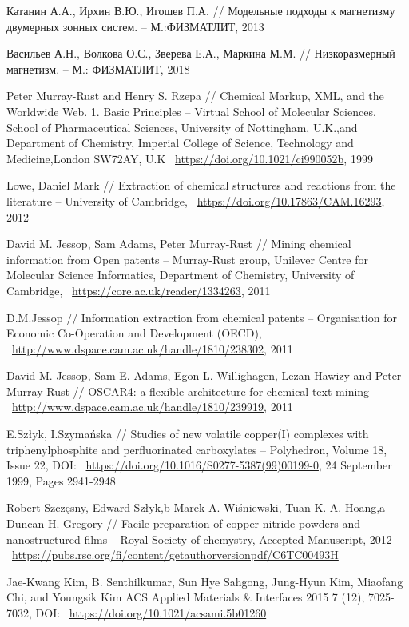 \documentclass[11pt]{article}
\begin{document}
\begin{thebibliography}{3}
Катанин А.А., Ирхин В.Ю., Игошев П.А. // Модельные подходы к магнетизму двумерных зонных систем. -- М.:ФИЗМАТЛИТ, 2013

Васильев А.Н., Волкова О.С., Зверева Е.А., Маркина М.М. // Низкоразмерный магнетизм. -- М.: ФИЗМАТЛИТ, 2018
 
Peter Murray-Rust and Henry S. Rzepa // Chemical Markup, XML, and the Worldwide Web. 1. Basic Principles -- Virtual School of Molecular Sciences, School of Pharmaceutical Sciences, University of Nottingham, U.K.,and Department of Chemistry, Imperial College of Science, Technology and Medicine,London SW72AY, U.K ~\url{https://doi.org/10.1021/ci990052b}, 1999

Lowe, Daniel Mark // Extraction of chemical structures and reactions from the literature -- University of Cambridge,  ~\url{https://doi.org/10.17863/CAM.16293}, 2012

David M. Jessop, Sam Adams, Peter Murray-Rust // Mining chemical information from Open patents -- Murray-Rust group, Unilever Centre for Molecular Science Informatics, Department of Chemistry, University of Cambridge, ~\url{https://core.ac.uk/reader/1334263}, 2011

D.M.Jessop // Information extraction from chemical patents -- Organisation for Economic Co-Operation and Development (OECD), ~\url{http://www.dspace.cam.ac.uk/handle/1810/238302}, 2011

David M. Jessop, Sam E. Adams, Egon L. Willighagen, Lezan Hawizy and Peter Murray-Rust // OSCAR4: a flexible architecture for chemical text-mining -- ~\url{http://www.dspace.cam.ac.uk/handle/1810/239919}, 2011

E.Szłyk, I.Szymańska // Studies of new volatile copper(I) complexes with triphenylphosphite and perfluorinated carboxylates -- Polyhedron, Volume 18, Issue 22, DOI: ~\url{https://doi.org/10.1016/S0277-5387(99)00199-0}, 24 September 1999, Pages 2941-2948

Robert Szczęsny, Edward Szłyk,b Marek A. Wiśniewski, Tuan K. A. Hoang,a Duncan H. Gregory // Facile preparation of copper nitride powders and nanostructured films -- Royal Society of chemystry, Accepted Manuscript, 2012 -- ~\url{https://pubs.rsc.org/fi/content/getauthorversionpdf/C6TC00493H}

Jae-Kwang Kim, B. Senthilkumar, Sun Hye Sahgong, Jung-Hyun Kim, Miaofang Chi, and Youngsik Kim
ACS Applied Materials \& Interfaces 2015 7 (12), 7025-7032, DOI: ~\url{https://doi.org/10.1021/acsami.5b01260}


\end{thebibliography}
\end{document}
